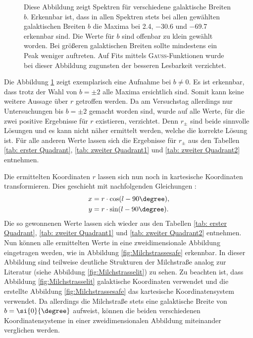 \begin{figure}[H]
    \centering
       
    \caption[Spektren für verschiedene galaktische Breiten $b$]{Diese Abbildung zeigt Spektren für verschiedene galaktische Breiten $b$. Erkennbar ist, dass in allen Spektren stets bei allen gewählten galaktischen Breiten $b$ die Maxima bei \SI{2.4}{}, \SI{-30.6}{} und \SI{-69.7}{} erkennbar sind. Die Werte für $b$ sind offenbar zu klein gewählt worden. Bei größeren galaktischen Breiten sollte mindestens ein Peak weniger auftreten. Auf Fits mittels \textsc{Gauß}-Funktionen wurde bei dieser Abbildung zugunsten der besseren Lesbarkeit verzichtet.}
    \label{fig:bungleichnull}
\end{figure}

Die Abbildung \ref{fig:bungleichnull} zeigt exemplarisch eine Aufnahme bei $b \neq 0$. Es ist erkennbar, dass trotz der Wahl von $b = \pm 2$ alle Maxima ersichtlich sind. Somit kann keine weitere Aussage über $r$ getroffen werden. 
Da am Versuchstag allerdings nur Untersuchungen bis $b = \pm 2$ gemacht worden sind, wurde auf alle Werte, für die zwei positive Ergebnisse für $r$ existieren, verzichtet. 
Denn $r_{\pm}$ sind beide sinnvolle Lösungen und es kann nicht näher ermittelt werden, welche die korrekte Lösung ist. 
Für alle anderen Werte lassen sich die Ergebnisse für $r_{\pm}$ aus den Tabellen \ref{tab: erster Quadrant}, \ref{tab: zweiter Quadrant1} und \ref{tab: zweiter Quadrant2} entnehmen.

Die ermittelten Koordinaten $r$ lassen sich nun noch in kartesische Koordinaten transformieren. 
Dies geschieht mit nachfolgenden Gleichungen \cite{H1}:
\begin{align}
    x &= r \cdot \cos(l-90\degree), \\
    y &= r \cdot \sin(l-90\degree).
    \label{eq:umrechnung}
\end{align}
Die so gewonnenen Werte lassen sich wieder aus den Tabellen \ref{tab: erster Quadrant}, \ref{tab: zweiter Quadrant1} und \ref{tab: zweiter Quadrant2} entnehmen.\newline
Nun können alle ermittelten Werte in eine zweidimensionale Abbildung eingetragen werden, wie in Abbildung \ref{fig:Milchstrassesafe} erkennbar. 
In dieser Abbildung sind teilweise deutliche Strukturen der Milchstraße analog zur Literatur (siehe Abbildung \ref{fig:Milchstrasselit}) zu sehen.
Zu beachten ist, dass Abbildung \ref{fig:Milchstrasselit} galaktische Koordinaten verwendet und die erstellte Abbildung \ref{fig:Milchstrassesafe} das kartesische Koordinatensystem verwendet.
Da allerdings die Milchstraße stets eine galaktische Breite von $b= \si{0}{\degree}$ aufweist, können die beiden verschiedenen Koordinatensysteme in einer zweidimensionalen Abbildung miteinander verglichen werden.\newline

